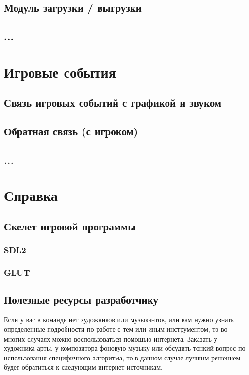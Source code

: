 \section{Модуль загрузки / выгрузки}
\section{...}

\chapter{Игровые события}
\section{Связь игровых событий с графикой и звуком}
\section{Обратная связь (с игроком)}
\section{...}

\chapter{Справка}

\section{Скелет игровой программы}
\subsection{SDL2}
\label{code:skeletonSDL2}


\pagebreak

\subsection{GLUT}
\label{code:skeletonGLUT}


\pagebreak

\section{Полезные ресурсы разработчику}
Если у вас в команде нет художников или музыкантов, или вам нужно узнать определенные подробности по работе 
с тем или иным инструментом, то во многих случаях можно воспользоваться помощью интернета. Заказать у 
художника арты, у композитора фоновую музыку или обсудить тонкий вопрос по использования специфичного 
алгоритма, то в данном случае лучшим решением будет обратиться к следующим интернет источникам.

